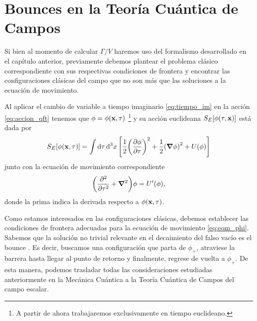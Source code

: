 \section{Bounces en la Teoría Cuántica de Campos}

Si bien al momento de calcular $\Gamma/V$ haremos uso del formalismo desarrollado en el capítulo anterior,
previamente debemos plantear el problema clásico correspondiente con sus respectivas condiciones de frontera y encontrar 
las configuraciones clásicas del campo que no son más que las soluciones a la ecuación de movimiento.  

Al aplicar el cambio de variable a tiempo imaginario \eqref{eq:tiempo_im} en la acción \eqref{eq:accion_qft} tenemos que $\phi = \phi\qty(\vb{x}, \tau)$ \footnote{A partir de ahora trabajaremos exclusivamente en tiempo euclideano. 
} 
y su acción euclideana $S_E\qty[\phi\qty(\tau, \vb{x})]$ está dada por
\begin{equation}
S_E\qty[\phi\qty(\vb{x}, \tau)] = \int \dd{\tau} \dd[3]{x} \qty[\frac{1}{2}\qty(\pdv{\phi}{\tau})^2 + \frac{1}{2}\qty(\grad{\phi})^2 + U\qty(\phi)]
\end{equation}
junto con la ecuación de movimiento correspondiente
\begin{equation} \label{eq:eom_phi}
\qty(\pdv[2]{\tau} + \grad{}^2)\phi = U'\qty(\phi),
\end{equation}
donde la prima indica la derivada respecto a $\phi\qty(\vb{x}, \tau)$. 

Como estamos interesados en las configuraciones clásicas,
debemos establecer las condiciones de frontera adecuadas para la ecuación de movimiento \eqref{eq:eom_phi}. Sabemos que la solución no trivial relevante en el decaimiento del falso vacío es el bounce \cite{coleman1977fate}. Es decir, buscamos una configuración que parta de $\phi_+$, atraviese la barrera hasta llegar al punto de retorno y finalmente, regrese de vuelta a $\phi_+$.  De esta manera, podemos trasladar todas las consideraciones estudiadas anteriormente en la Mecánica Cuántica a la Teoría Cuántica de Campos del campo escalar. 

